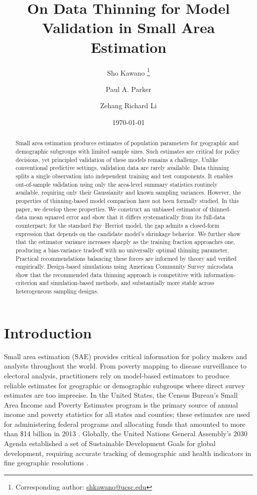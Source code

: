 \documentclass[11pt]{article}
\title{On Data Thinning for Model Validation in Small Area Estimation}
\author{Sho Kawano \orcidlink{0009-0008-1841-8305}\thanks{Corresponding author: \href{mailto:shkawano@ucsc.edu}{shkawano@ucsc.edu}}}
\author{Paul A. Parker \orcidlink{0000-0002-3206-6122}}
\author{Zehang Richard Li \orcidlink{0000-0001-9551-9638}}
\affil{Department of Statistics, University of California, Santa Cruz, CA 95064}
\date{\today}
\theoremstyle{plain}
\theoremstyle{definition}
\theoremstyle{remark}
\begin{document}
\maketitle

\begin{abstract}
Small area estimation produces estimates of population parameters for geographic and demographic subgroups with limited sample sizes. Such estimates are critical for policy decisions, yet principled validation of these models remains a challenge. Unlike conventional predictive settings, validation data are rarely available. Data thinning splits a single observation into independent training and test components. It enables out-of-sample validation using only the area-level summary statistics routinely available, requiring only their Gaussianity and known sampling variances. However, the properties of thinning-based model comparison have not been formally studied. In this paper, we develop these properties. We construct an unbiased estimator of thinned-data mean squared error and show that it differs systematically from its full-data counterpart; for the standard Fay--Herriot model, the gap admits a closed-form expression that depends on the candidate model's shrinkage behavior. We further show that the estimator variance increases sharply as the training fraction approaches one, producing a bias-variance tradeoff with no universally optimal thinning parameter. Practical recommendations balancing these forces are informed by theory and verified empirically. Design-based simulations using American Community Survey microdata show that the recommended data thinning approach is competitive with information-criterion and simulation-based methods, and substantially more stable across heterogeneous sampling designs.
\end{abstract}

\section{Introduction}

Small area estimation (SAE) provides critical information for policy makers and analysts throughout the world. From poverty mapping to disease surveillance to electoral analysis, practitioners rely on model-based estimators to produce reliable estimates for geographic or demographic subgroups where direct survey estimates are too imprecise. In the United States, the Census Bureau's Small Area Income and Poverty Estimates program is the primary source of annual income and poverty statistics for all states and counties; these estimates are used for administering federal programs and allocating funds that amounted to more than \$14 billion in 2013 \citep{pratesi_overview_2016}. Globally, the United Nations General Assembly’s 2030 Agenda established a set of Sustainable Development Goals for global development, requiring accurate tracking of demographic and health indicators in fine geographic resolutions \citep{general_assemby_of_the_united_nations_resolution_2015}.
\end{document}
